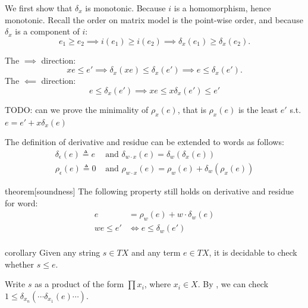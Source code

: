 \documentclass[a4paper,UKenglish,cleveref, autoref, thm-restate]{lipics-v2021}
\begin{document}
\begin{proofEnd}
  We first show that \( \delta _{x}\) is monotonic.
  Because \(i\) is a homomorphism, hence monotonic.
  Recall the order on matrix model is the point-wise order,
  and because \( \delta _{x}\) is a component of \(i\):
  \[e_{1}  \geq  e_{2}  \implies  i(e_{1})  \geq  i(e_{2})  \implies   \delta _{x}(e_{1})  \geq   \delta _{x}(e_{2}).\]

  The \( \implies \) direction:
  \[xe  \leq  e'  \implies   \delta _{x}(xe)  \leq   \delta _{x}(e')  \implies  e  \leq   \delta _{x}(e').\]
  The \( \impliedby \) direction:
  \[e  \leq   \delta _x(e')  \implies  x e  \leq  x  \delta _x(e')  \leq  e'\]
\end{proofEnd}

TODO: can we prove the minimality of \( \rho _{x}(e)\),
that is \( \rho _{x}(e)\) is the least \(e'\) s.t. \(e = e' + x  \delta _{x}(e)\)

\begin{definition}
  The definition of derivative and residue can be extended to words as follows:
  \begin{align*}
     \delta _ \epsilon (e)  \triangleq  e & \text{ and }  \delta _{w  \cdot  x}(e) =  \delta _w( \delta _{x}(e))\\
     \rho _ \epsilon (e)  \triangleq  0 & \text{ and }  \rho _{w  \cdot  x}(e) =  \rho _w(e) +  \delta _w ( \rho _{x}(e))
  \end{align*}
\end{definition}

\begin{theoremEnd}{theorem}[soundness]
  The following property still holds on derivative and residue for word:
  \begin{align*}
    e & =  \rho _w(e) + w  \cdot   \delta _w(e) \\
    w e  \leq  e' &  \iff  e  \leq   \delta _w(e') \\
  \end{align*}
\end{theoremEnd}

\begin{theoremEnd}{corollary}
  \label{cor:membership-decidability}
  Given any string $s  \in  TX$ and any term $e  \in  TX$, it is decidable to check
  whether $s  \leq  e$.
\end{theoremEnd}

\begin{proofEnd}
  Write $s$ as a product of the form $ \prod  x_i$, where $x_i  \in  X$.  By
  , we can
  check $1  \leq   \delta _{x_n}( \cdots  \delta _{x_1}(e) \cdots )$.
\end{proofEnd}
\end{document}
